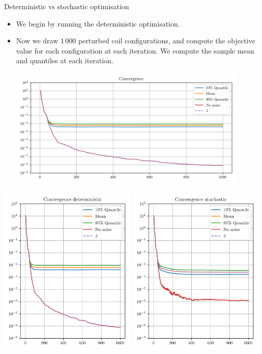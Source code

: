\documentclass[aspectratio=1610, 10pt]{beamer}
\begin{document}
\begin{frame}{Deterministic vs stochastic optimisation}
    \begin{itemize}
        \item We begin by running the deterministic optimisation.
        \item Now we draw $1\,000$ perturbed coil configurations, and compute the objective value for each configuration at each iteration. We compute the sample mean and quantiles at each iteration.
            \begin{center}
                \includegraphics[width=0.9\textwidth]{./img/convergence_objective_det.png}
            \end{center}
    \end{itemize}
\end{frame}
\begin{frame}
    \begin{center}
        \includegraphics[width=0.49\textwidth]{./img/convergence_objective_det_tall.png}
        \includegraphics[width=0.49\textwidth]{./img/convergence_objective_stoch_tall.png}
    \end{center}
\end{frame}
\end{document}
